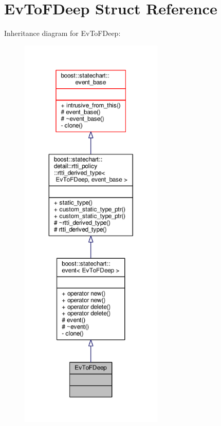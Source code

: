 \hypertarget{struct_ev_to_f_deep}{}\section{Ev\+To\+F\+Deep Struct Reference}
\label{struct_ev_to_f_deep}


Inheritance diagram for Ev\+To\+F\+Deep\+:
\nopagebreak
\begin{figure}[H]
\begin{center}
\leavevmode
\includegraphics[height=550pt]{struct_ev_to_f_deep__inherit__graph}
\end{center}
\end{figure}



